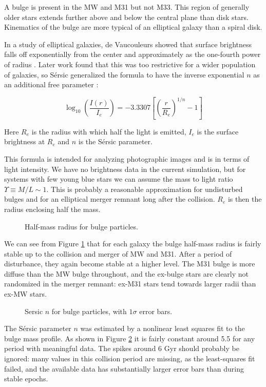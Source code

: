 \documentclass[twocolumn]{aastex63}
\begin{document}
A bulge is present in the MW and M31 but not M33. This region of generally older stars extends further above and below the central plane than disk stars. Kinematics of the bulge are more typical of an elliptical galaxy than a spiral disk.

In a study of elliptical galaxies, de Vaucouleurs showed that surface brightness falls off exponentially from the center and approximately as the one-fourth power of radius \citep{de_vaucouleurs_recherches_1948}. Later work found that this was too restrictive for a wider population of galaxies, so Sérsic generalized the formula to have the inverse exponential $n$ as an additional free parameter \citep{sersic_influence_1963}:

\[ \log_{10} \left( \frac{I(r)}{I_e} \right) =  -3.3307 \left[ \left( \frac{r}{R_e} \right)^{1/n} - 1 \right] \]

Here $R_e$ is the radius with which half the light is emitted,  $I_e$ is the surface brightness at $R_e$ and $n$ is the Sérsic parameter.

This formula is intended for analyzing photographic images and is in terms of light intensity. We have no brightness data in the current simulation, but for systems with few young blue stars we can assume the mass to light ratio $\Upsilon \equiv M/L \sim 1$. This is probably a reasonable approximation for undisturbed bulges and for an elliptical merger remnant long after the collision. $R_e$ is then the radius enclosing half the mass.

\begin{figure}[bht!]
	\caption{Half-mass radius for bulge particles.
		\label{fig:sersic_Re}}
\end{figure}

We can see from Figure \ref{fig:sersic_Re} that for each galaxy the bulge half-mass radius is fairly stable up to the collision and merger of MW and M31. After a period of disturbance, they again become stable at a higher level. The M31 bulge is more diffuse than the MW bulge throughout, and the ex-bulge stars are clearly not randomized in the merger remnant: ex-M31 stars tend towards larger radii than ex-MW stars.

\begin{figure}[bht!]
	\caption{Sersic $n$ for bulge particles, with $1\sigma$ error bars.
		\label{fig:sersic_n}}
\end{figure}

The Sérsic parameter $n$ was estimated by a nonlinear least squares fit to the bulge mass profile. As shown in Figure \ref{fig:sersic_n} it is fairly constant around 5.5 for any period with meaningful data. The spikes around 6 Gyr should probably be ignored: many values in this collision period are missing, as the least-squares fit failed, and the available data has substantially larger error bars than during stable epochs.
\end{document}
